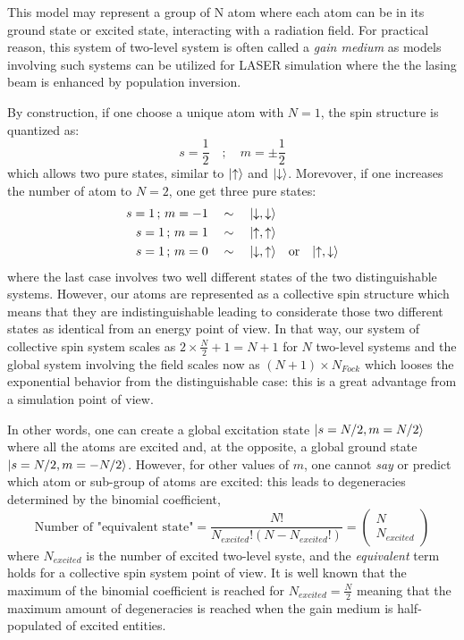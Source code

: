 \documentclass[12pt]{report}
\DeclarePairedDelimiter\ket{\lvert}{\rangle}
\begin{document}
This model may represent a group of N atom where each atom can be in its ground state or excited state, interacting with a radiation field. For practical reason, this system of two-level system is often called a \textit{gain medium} as models involving such systems can be utilized for LASER simulation where the the lasing beam is enhanced by population inversion.

By construction, if one choose a unique atom with $N=1$, the spin structure is quantized as:
\begin{equation}
s = \frac{1}{2} \quad; \quad m = \pm \frac{1}{2}
\end{equation}
which allows two pure states, similar to $\ket{\uparrow}$ and $\ket{\downarrow}$. Morevover, if one increases the number of atom to $N=2$, one get three pure states:
\begin{align*}
s = 1 \,;\, m = -1 \quad &\sim \quad \ket{\downarrow, \downarrow}\\
s = 1 \,;\, m = 1 \quad &\sim \quad \ket{\uparrow, \uparrow}\\
s = 1 \,;\, m = 0 \quad &\sim \quad \ket{\downarrow, \uparrow} \quad \textrm{or} \quad \ket{\uparrow, \downarrow}\\
\end{align*}
where the last case involves two well different states of the two distinguishable systems. However, our atoms are represented as a collective spin structure which means that they are indistinguishable leading to considerate those two different states as identical from an energy point of view. In that way, our system of collective spin system scales as $2 \times \frac{N}{2} + 1 = N + 1$ for $N$ two-level systems and the global system involving the field scales now as $(N+1) \times N_{Fock}$ which looses the exponential behavior from the distinguishable case: this is a great advantage from a simulation point of view.

In other words, one can create a global excitation state $\ket{s = N/2, m = N/2}$ where all the atoms are excited and, at the opposite, a global ground state $\ket{s = N/2, m = -N/2}$. However, for other values of $m$, one cannot \textit{say} or predict which atom or sub-group of atoms are excited: this leads to degeneracies determined by the binomial coefficient,
\begin{equation}
\textrm{Number of "equivalent state"} = \frac{N!}{N_{excited}!(N-N_{excited}!)} = \begin{pmatrix}
N\\
N_{excited}
\end{pmatrix} 	
\end{equation}
where $N_{excited}$ is the number of excited two-level syste, and the \textit{equivalent} term holds for a collective spin system point of view. It is well known that the maximum of the binomial coefficient is reached for $N_{excited} = \frac{N}{2}$ meaning that the maximum amount of degeneracies is reached when the gain medium is half-populated of excited entities.
\end{document}
